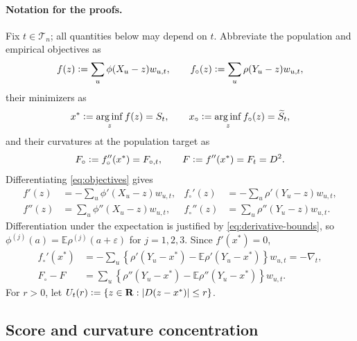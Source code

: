 \documentclass[11pt]{article}
\newcommand{\E}{\mathbb{E}}
\newcommand{\R}{\mathbf{R}}
\newcommand{\eqdef}{\mathrel{\vcentcolon=}}
\newcommand{\arginf}{\mathop{\mathrm{arg\,inf}}}
\newcommand{\rhohu}{\rho}
\newcommand{\rhohum}{\phi}
\newcommand{\Signal}{X}
\newcommand{\Data}{Y}
\newcommand{\IMFs}{S}
\newcommand{\IMFt}{\widetilde S}
\newcommand{\IF}{F}
\newcommand{\IFP}{F_{\circ}}
\newcommand{\IFPt}{F_{\circ,t}}
\newcommand{\DFN}{D}
\newcommand{\fs}{f}
\newcommand{\fp}{f_{\circ}}
\newcommand{\xs}{x^{*}}
\newcommand{\xp}{x_{\circ}}
\theoremstyle{definition}
\begin{document}
\paragraph{Notation for the proofs.}
Fix \(t\in\mathcal T_n\); all quantities below may depend on \(t\).
Abbreviate the population and empirical objectives as
\begin{equation}
  \fs(z)\eqdef\sum_u\rhohum(\Signal_u-z)w_{u,t},
  \qquad
  \fp(z)\eqdef\sum_u\rhohu(\Data_u-z)w_{u,t},
  \label{eq:objectives}
\end{equation}
their minimizers as
\begin{equation}
  \xs\eqdef\arginf_z\fs(z)=\IMFs_t,
  \qquad
  \xp\eqdef\arginf_z\fp(z)=\IMFt_t,
  \label{eq:minimizers}
\end{equation}
and their curvatures at the population target as
\begin{equation}
  \IFP\eqdef\fp''(\xs)=\IFPt,
  \qquad
  \IF\eqdef\fs''(\xs)=\IF_t=\DFN^2.
  \label{eq:F-Fcirc}
\end{equation}
Differentiating \eqref{eq:objectives} gives
\begin{align*}
  \fs'(z)&=-\sum_u\rhohum'(\Signal_u-z)w_{u,t},
  &
  \fp'(z)&=-\sum_u\rhohu'(\Data_u-z)w_{u,t},\\
  \fs''(z)&=\sum_u\rhohum''(\Signal_u-z)w_{u,t},
  &
  \fp''(z)&=\sum_u\rhohu''(\Data_u-z)w_{u,t}.
\end{align*}
Differentiation under the expectation is justified by
\eqref{eq:derivative-bounds}, so
\(\rhohum^{(j)}(a)=\E\rhohu^{(j)}(a+\varepsilon)\) for \(j=1,2,3\).
Since \(\fs'(\xs)=0\),
\begin{align}
  \fp'(\xs)
  &=-\sum_u\left\{
      \rhohu'(\Data_u-\xs)-\E\rhohu'(\Data_u-\xs)
    \right\}w_{u,t}
  =-\nabla_t,
  \label{eq:score-sign}\\
  \IFP-\IF
  &=\sum_u\left\{
      \rhohu''(\Data_u-\xs)-\E\rhohu''(\Data_u-\xs)
    \right\}w_{u,t}.
  \label{eq:curvature-sign}
\end{align}
For \(r>0\), let \(U_t(r)\eqdef\{z\in\R:|\DFN(z-\xs)|\leq r\}\).

\subsection{Score and curvature concentration}
\end{document}
